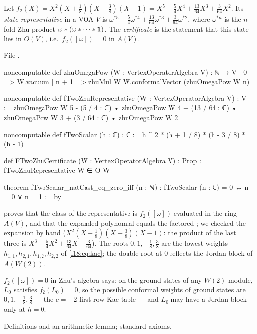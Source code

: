 \begin{definition}\label{l18:def:ftwo}
Let $f_2(X)=X^2(X+\tfrac18)(X-\tfrac38)(X-1)=X^5-\tfrac54X^4+\tfrac{13}{64}X^3+\tfrac3{64}X^2$. Its
\emph{state representative} in a VOA $V$ is $\omega^{*5}-\tfrac54\omega^{*4}+\tfrac{13}{64}\omega^{*3}+\tfrac3{64}\omega^{*2}$,
where $\omega^{*n}$ is the $n$-fold Zhu product $\omega*(\omega*\cdots*\mathbf{1})$. The \emph{certificate} is the
statement that this state lies in $O(V)$, i.e.\ $f_2([\omega])=0$ in $A(V)$.
\end{definition}
\noindent File .
\begin{leancode}
noncomputable def zhuOmegaPow (W : VertexOperatorAlgebra V) : ℕ → V
  | 0 => W.vacuum
  | n + 1 => zhuMul W W.conformalVector (zhuOmegaPow W n)

noncomputable def fTwoZhuRepresentative (W : VertexOperatorAlgebra V) : V :=
  zhuOmegaPow W 5
    - (5 / 4 : ℂ) • zhuOmegaPow W 4
    + (13 / 64 : ℂ) • zhuOmegaPow W 3
    + (3 / 64 : ℂ) • zhuOmegaPow W 2

noncomputable def fTwoScalar (h : ℂ) : ℂ :=
  h ^ 2 * (h + 1 / 8) * (h - 3 / 8) * (h - 1)

def FTwoZhuCertificate (W : VertexOperatorAlgebra V) : Prop :=
  fTwoZhuRepresentative W ∈ O W

theorem fTwoScalar_natCast_eq_zero_iff (n : ℕ) :
    fTwoScalar (n : ℂ) = 0 ↔ n = 0 ∨ n = 1 := by
\end{leancode}
\begin{dictionary}
 proves that the class of the representative is
$f_2([\omega])$ evaluated in the ring $A(V)$, and  that the expanded polynomial
equals the factored ; we checked the expansion by hand
($X^2(X+\frac18)(X-\frac38)(X-1)$: the product of the last three is $X^3-\frac54X^2+\frac{13}{64}X+\frac{3}{64}$). The
roots $0,1,-\frac18,\frac38$ are the lowest weights $h_{1,1},h_{2,1},h_{1,2},h_{2,2}$ of \eqref{l18:eq:kac}; the
double root at $0$ reflects the Jordan block of $A(W(2))$.
\end{dictionary}
\begin{physics}
$f_2([\omega])=0$ in Zhu's algebra says: on the ground states of any $W(2)$-module, $L_0$ satisfies
$f_2(L_0)=0$, so the possible conformal weights of ground states are $0,1,-\frac18,\frac38$ --- the $c=-2$
first-row Kac table --- and $L_0$ may have a Jordan block only at $h=0$.
\end{physics}
\begin{status}
Definitions and an arithmetic lemma; standard axioms.
\end{status}

